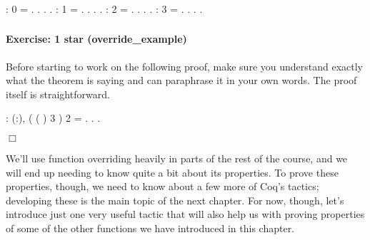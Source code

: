 \documentclass[12pt]{report}
\begin{document}
\subsubsection{ }

\begin{coqdoccode}
\coqdocemptyline
\coqdocnoindent
{}  :  0 = .\coqdoceol
\coqdocnoindent
{}. . .\coqdoceol
\coqdocemptyline
\coqdocnoindent
{}  :  1 = .\coqdoceol
\coqdocnoindent
{}. . .\coqdoceol
\coqdocemptyline
\coqdocnoindent
{}  :  2 = .\coqdoceol
\coqdocnoindent
{}. . .\coqdoceol
\coqdocemptyline
\coqdocnoindent
{}  :  3 = .\coqdoceol
\coqdocnoindent
{}. . .\coqdoceol
\coqdocemptyline
\end{coqdoccode}
\subsubsection{ }



\paragraph{Exercise: 1 star (override\_example)}

 Before starting to work on the following proof, make sure you
    understand exactly what the theorem is saying and can paraphrase
    it in your own words.  The proof itself is straightforward. \begin{coqdoccode}
\coqdocemptyline
\coqdocnoindent
{}  : \coqdockw{\ensuremath{\forall}} (:),\coqdoceol
\coqdocindent{1.00em}
( ( ) 3 ) 2 = .\coqdoceol
\coqdocnoindent
{}.\coqdoceol
 .\coqdoceol
\end{coqdoccode}
\ensuremath{\Box} 

 We'll use function overriding heavily in parts of the rest of the
    course, and we will end up needing to know quite a bit about its
    properties.  To prove these properties, though, we need to know
    about a few more of Coq's tactics; developing these is the main
    topic of the next chapter.  For now, though, let's introduce just
    one very useful tactic that will also help us with proving
    properties of some of the other functions we have introduced in
    this chapter. \begin{coqdoccode}
\coqdocemptyline
\coqdocemptyline
\end{coqdoccode}
\end{document}

